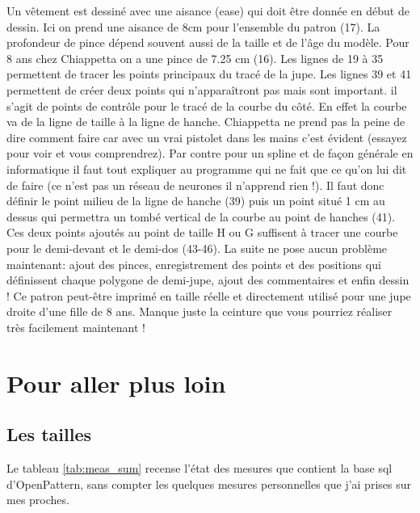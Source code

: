 \documentclass[10pt,a4paper,twoside]{report}
\begin{document}
Un vêtement est dessiné avec une aisance (ease) qui doit être donnée en début de dessin. Ici on prend une aisance de 8cm pour l'ensemble du patron (17). La profondeur de pince dépend souvent aussi de la taille et de l'âge du modèle. Pour 8 ans chez Chiappetta \cite{Chiappetta1999} on a une pince de 7.25 cm (16). Les lignes de 19 à 35 permettent de tracer les points principaux du tracé de la jupe. Les lignes 39 et 41 permettent de créer deux points qui n'apparaîtront pas mais sont important. il s'agit de points de contrôle pour le tracé de la courbe du côté. En effet la courbe va de la ligne de taille à la ligne de hanche. Chiappetta ne  prend pas la peine de dire comment faire car avec un vrai pistolet dans les mains c'est évident (essayez pour voir et vous comprendrez). Par contre pour un spline et de façon générale en informatique il faut tout expliquer au programme qui ne fait que ce qu'on lui dit de faire (ce n'est pas un réseau de neurones il n'apprend rien !). Il faut donc définir le point milieu de la ligne de hanche (39) puis un point situé 1 cm au dessus qui permettra un tombé vertical de la courbe au point de hanches (41). Ces deux points ajoutés au point de taille H ou G suffisent à tracer une courbe pour le demi-devant et le demi-dos (43-46). La suite ne pose aucun problème maintenant: ajout des pinces, enregistrement des points et des positions qui définissent chaque polygone de demi-jupe, ajout des commentaires  et enfin dessin ! Ce patron peut-être imprimé en taille réelle et directement utilisé pour une jupe droite d'une fille de 8 ans. Manque juste la ceinture  que vous pourriez réaliser très facilement maintenant !


\chapter{Pour aller plus loin}

\section{Les tailles}
\label{par:tailles}
Le tableau \ref{tab:meas_sum} recense l'état des mesures que contient la base sql d'OpenPattern, sans compter les quelques mesures personnelles que j'ai prises sur mes proches.
\end{document}
